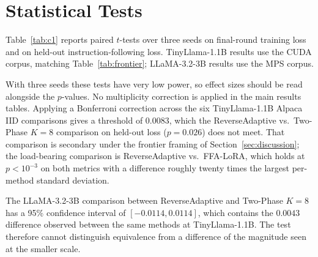 \section{Statistical Tests}
\label{app:stats}
Table~\ref{tab:c1} reports paired $t$-tests over three seeds on final-round training loss and on held-out instruction-following loss. TinyLlama-1.1B results use the CUDA corpus, matching Table~\ref{tab:frontier}; LLaMA-3.2-3B results use the MPS corpus.

With three seeds these tests have very low power, so effect sizes should be read alongside the $p$-values. No multiplicity correction is applied in the main results tables. Applying a Bonferroni correction across the six TinyLlama-1.1B Alpaca IID comparisons gives a threshold of $0.0083$, which the ReverseAdaptive vs.\ Two-Phase $K{=}8$ comparison on held-out loss ($p = 0.026$) does not meet. That comparison is secondary under the frontier framing of Section~\ref{sec:discussion}; the load-bearing comparison is ReverseAdaptive vs.\ FFA-LoRA, which holds at $p < 10^{-3}$ on both metrics with a difference roughly twenty times the largest per-method standard deviation.

The LLaMA-3.2-3B comparison between ReverseAdaptive and Two-Phase $K{=}8$ has a 95\% confidence interval of $[{-}0.0114, 0.0114]$, which contains the $0.0043$ difference observed between the same methods at TinyLlama-1.1B. The test therefore cannot distinguish equivalence from a difference of the magnitude seen at the smaller scale.

